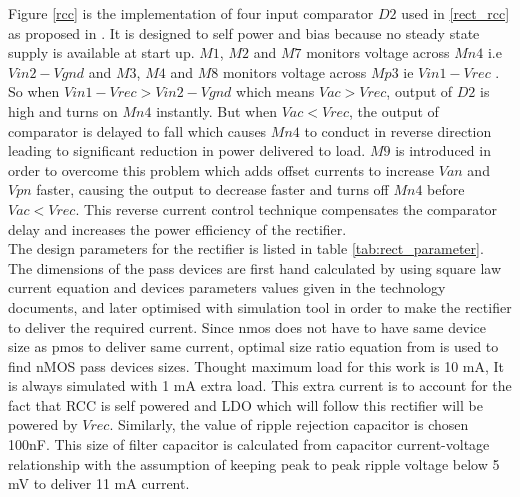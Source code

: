 \documentclass[12pt,a4paper,UKenglish]{report}
\begin{document}
Figure \ref{rcc}  is the implementation of four input comparator $D2$ used in \ref{rect_rcc} as proposed in \cite{rectrcc}. It is designed to self power and bias because no steady state supply is available at start up. $M1$, $M2$ and $M7$ monitors voltage across $Mn4$ i.e $Vin2 - Vgnd$ and $M3$, $M4$ and $M8$ monitors voltage across $Mp3$ ie $Vin1 - Vrec$ . So when $Vin1 - Vrec > Vin2 - Vgnd$ which means $Vac > Vrec$, output of $D2$ is high and turns on $Mn4$ instantly. But when $Vac < Vrec$, the output of comparator is delayed to fall which causes $Mn4$ to conduct in reverse direction leading to significant reduction in power delivered to load. $M9$ is introduced in order to overcome this problem which adds offset currents to increase $Van$ and $Vpn$ faster, causing the output to decrease faster and turns off $Mn4$ before $Vac < Vrec$. This reverse current control technique compensates the comparator delay and increases the power efficiency of the rectifier. \\

The design parameters for the rectifier is listed in table  \ref{tab:rect_parameter}. The dimensions of the pass devices are first hand calculated by using square law current equation and devices parameters values given in the technology documents, and later optimised with simulation tool in order to make the rectifier to deliver the required current. Since \acrshort{nmos} does not have to have same device size as \acrshort{pmos} to deliver same current, optimal size ratio equation from \cite{rectsize} is used to find nMOS pass devices sizes. Thought maximum load for this work is 10 mA, It is always simulated with 1 mA extra load. This extra current is to account for the fact that RCC is self powered and LDO which will follow this rectifier will be powered by $Vrec$. Similarly, the value of ripple rejection capacitor is chosen 100nF. This size of 
filter capacitor is calculated from capacitor current-voltage relationship with the assumption of keeping peak to peak ripple voltage below 5 mV to deliver 11 mA current.  \\
\end{document}
